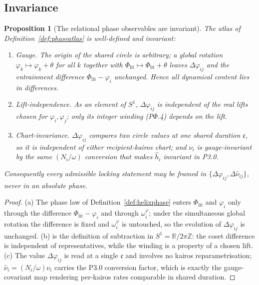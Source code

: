 \documentclass[11pt,a4paper]{article}
\newcommand{\cint}{\ensuremath{\mathfrak c}}
\theoremstyle{definition}
\theoremstyle{plain}
\newtheorem{proposition}[definition]{Proposition}
\theoremstyle{remark}
\begin{document}
\subsection{Invariance}

\begin{proposition}[The relational phase observables are invariant]\label{prop:phaseinv}
The atlas of Definition~\ref{def:phaseatlas} is well-defined and invariant:
\begin{enumerate}[label=\textup{(\alph*)},leftmargin=1.2cm]
\item \emph{Gauge.} The origin of the shared circle is arbitrary; a global rotation
\(\varphi_k\mapsto\varphi_k+\theta\) for all \(k\) together with
\(\Phi_{\mathrm{lit}}\mapsto\Phi_{\mathrm{lit}}+\theta\) leaves \(\Delta\varphi_{ij}\) and the
entrainment difference \(\Phi_{\mathrm{lit}}-\varphi_i\) unchanged. Hence all dynamical content
lies in differences.
\item \emph{Lift-independence.} As an element of \(S^1\), \(\Delta\varphi_{ij}\) is independent
of the real lifts chosen for \(\varphi_i,\varphi_j\); only its integer winding (P$\Phi$.4)
depends on the lift.
\item \emph{Chart-invariance.} \(\Delta\varphi_{ij}\) compares two circle values at one shared
duration \(\cint\), so it is independent of either recipient-kairos chart; and \(\hat\nu_i\) is
gauge-invariant by the same \((N_i/\omega)\) conversion that makes \(\hat h_i\) invariant in
P3.0.
\end{enumerate}
Consequently every admissible locking statement may be framed in
\(\{\Delta\varphi_{ij},\Delta\hat\nu_{ij}\}\), never in an absolute phase.
\end{proposition}

\begin{proof}
(a) The phase law of Definition~\ref{def:helixphase} enters \(\Phi_{\mathrm{lit}}\) and
\(\varphi_i\) only through the difference \(\Phi_{\mathrm{lit}}-\varphi_i\) and through
\(\omega_i^\varphi\); under the simultaneous global rotation the difference is fixed and
\(\omega_i^\varphi\) is untouched, so the evolution of \(\Delta\varphi_{ij}\) is unchanged. (b)
is the definition of subtraction in \(S^1=\mathbb R/2\pi\mathbb Z\): the coset difference is
independent of representatives, while the winding is a property of a chosen lift. (c) The value
\(\Delta\varphi_{ij}\) is read at a single \(\cint\) and involves no kairos reparametrisation;
\(\hat\nu_i=(N_i/\omega)\nu_i\) carries the P3.0 conversion factor, which is exactly the
gauge-covariant map rendering per-kairos rates comparable in shared duration. \qedhere
\end{proof}
\end{document}
